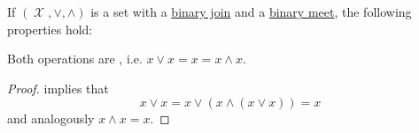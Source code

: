 \begin{proposition}\label{thm:binary_lattice_operations_properties}
  If \( (\mscrX, \vee, \wedge) \) is a set with a \hyperref[def:binary_lattice_operations/join]{binary join} and a \hyperref[def:binary_lattice_operations/meet]{binary meet}, the following properties hold:
  \begin{thmenum}
     Both operations are , i.e. \( x \vee x = x = x \wedge x \).
  \end{thmenum}
\end{proposition}
\begin{proof}
    implies that
  \begin{equation*}
    x \vee x = x \vee (x \wedge (x \vee x)) = x
  \end{equation*}
  and analogously \( x \wedge x = x \).
\end{proof}

